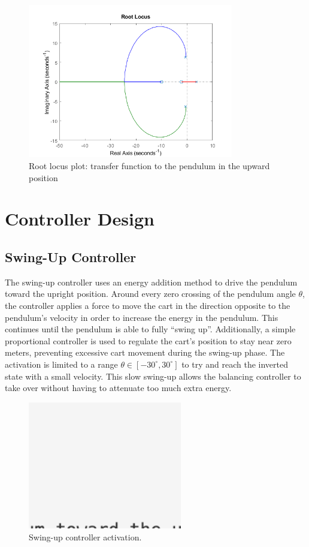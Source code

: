 \documentclass[12pt]{article}
\begin{document}
\begin{figure}[H]
    \centering
    \includegraphics[width=0.8\textwidth]{../plots/rlocus_up.png}
    \caption{Root locus plot: transfer function to the pendulum in the upward position}
    \label{fig:rl_up}
\end{figure}

\section{Controller Design}

\subsection{Swing-Up Controller}
The swing-up controller uses an energy addition method to drive the pendulum toward the upright position.
Around every zero crossing of the pendulum angle $\theta$, the controller applies a force to move the cart in the direction opposite to the pendulum's velocity in order to increase the energy in the pendulum.
This continues until the pendulum is able to fully ``swing up''.
Additionally, a simple proportional controller is used to regulate the cart's position to stay near zero meters, preventing excessive cart movement during the swing-up phase.
The activation is limited to a range $\theta \in [-30^\circ,30^\circ]$ to try and reach the inverted state with a small velocity. This slow swing-up allows the balancing controller to take over without having to attenuate too much extra energy.


\begin{figure}[H]
    \centering
    \includegraphics[width=0.6\textwidth]{figures/ph.png}
    \caption{Swing-up controller activation.}
    \label{fig:swingup}
\end{figure}
\end{document}
